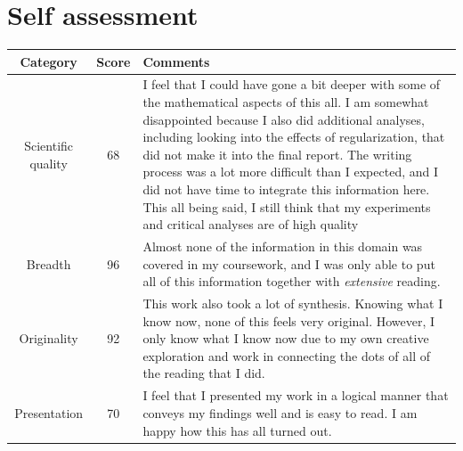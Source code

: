 \documentclass[11pt]{article}
\begin{document}
\printbibliography
\newpage
\thispagestyle{empty} 
\section*{Self assessment}
\vspace{1cm}
\begin{center}
\begin{tabular}{ |c|c|L| } 
 \hline
 Category & Score & Comments \\ 
 \hline
 \hline
 Scientific quality & 68 & I feel that I could have gone a bit deeper with some of the mathematical aspects of this all. I am somewhat disappointed because I also did additional analyses, including looking into the effects of regularization, that did not make it into the final report. The writing process was a lot more difficult than I expected, and I did not have time to integrate this information here. This all being said, I still think that my experiments and critical analyses are of high quality\\ 
 \hline
 Breadth & 96 & Almost none of the information in this domain was covered in my coursework, and I was only able to put all of this information together with \textit{extensive} reading. \\ 
 \hline
 Originality & 92 & This work also took a lot of synthesis. Knowing what I know now, none of this feels very original. However, I only know what I know now due to my own creative exploration and work in connecting the dots of all of the reading that I did. \\ 
 \hline
 Presentation & 70 & I feel that I presented my work in a logical manner that conveys my findings well and is easy to read. I am happy how this has all turned out.\\ 
 \hline
\end{tabular}
\end{center}
\end{document}
